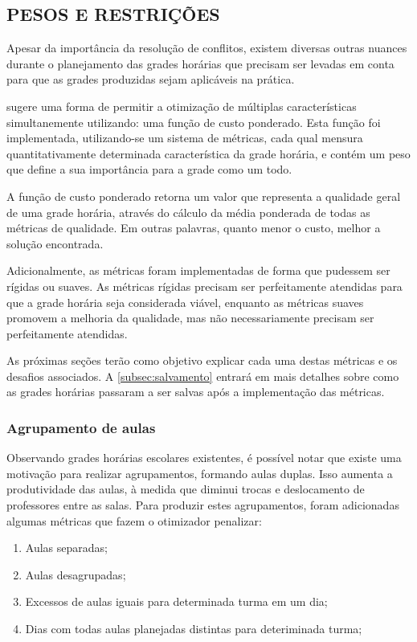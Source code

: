 \subsection{PESOS E RESTRIÇÕES}
\label{subsec:pesos_e_restricoes}

Apesar da importância da resolução de conflitos, existem diversas outras nuances durante o planejamento das grades horárias que precisam ser levadas em conta para que as grades produzidas sejam aplicáveis na prática.

 sugere uma forma de permitir a otimização de múltiplas características simultanemente utilizando: uma função de custo ponderado. Esta função foi implementada, utilizando-se um sistema de métricas, cada qual mensura quantitativamente determinada característica da grade horária, e contém um peso que define a sua importância para a grade como um todo. 

A função de custo ponderado retorna um valor que representa a qualidade geral de uma grade horária, através do cálculo da média ponderada de todas as métricas de qualidade. Em outras palavras, quanto menor o custo, melhor a solução encontrada.

Adicionalmente, as métricas foram implementadas de forma que pudessem ser rígidas ou suaves. As métricas rígidas precisam ser perfeitamente atendidas para que a grade horária seja considerada viável, enquanto as métricas suaves promovem a melhoria da qualidade, mas não necessariamente precisam ser perfeitamente atendidas.

As próximas seções terão como objetivo explicar cada uma destas métricas e os desafios associados. A \autoref{subsec:salvamento} entrará em mais detalhes sobre como as grades horárias passaram a ser salvas após a implementação das métricas.

\subsubsection{Agrupamento de aulas}

Observando grades horárias escolares existentes, é possível notar que existe uma motivação para realizar agrupamentos, formando aulas duplas. Isso aumenta a produtividade das aulas, à medida que diminui trocas e deslocamento de professores entre as salas. Para produzir estes agrupamentos, foram adicionadas algumas métricas que fazem o otimizador penalizar:

\begin{enumerate}
	\item Aulas separadas;
	\item Aulas desagrupadas;
	\item Excessos de aulas iguais para determinada turma em um dia;
	\item Dias com todas aulas planejadas distintas para deteriminada turma;
\end{enumerate}

